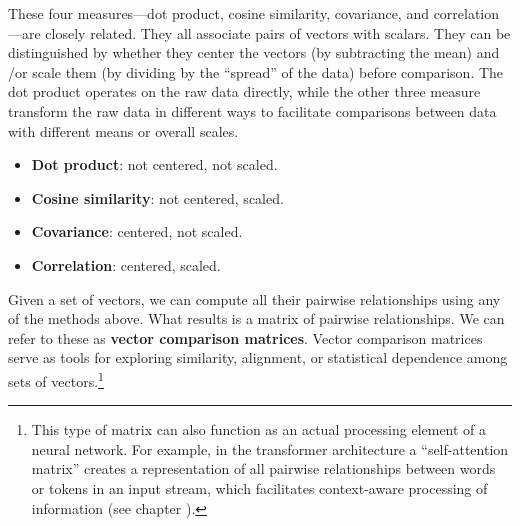 
   These four measures—dot product, cosine similarity, covariance, and 
correlation—are closely related. They all associate pairs of vectors with 
scalars. They can be distinguished by whether they center the vectors (by 
subtracting the mean) and /or scale them (by dividing by the 
``spread'' of the data) before comparison. The dot product operates on the raw
data directly, while the other three measure transform the raw data in 
different ways to facilitate comparisons between data with different means or 
overall scales.

\begin{itemize}
    \item \textbf{Dot product}: not centered, not scaled.
    \item \textbf{Cosine similarity}: not centered, scaled.
    \item \textbf{Covariance}: centered, not scaled.
    \item \textbf{Correlation}: centered, scaled.
\end{itemize}

Given a set of vectors, we can compute all their pairwise relationships using any of the methods above. What results is a matrix of pairwise relationships. We can refer to these as \textbf{vector comparison matrices}. Vector comparison matrices serve as  tools for exploring similarity, alignment, or statistical dependence among sets of vectors.\footnote{This type of matrix can also function as an actual processing element of a neural network. For example,  in the transformer architecture a ``self-attention matrix'' creates a representation of all pairwise relationships between words or tokens in an input stream, which facilitates context-aware processing of information (see chapter ).}  

